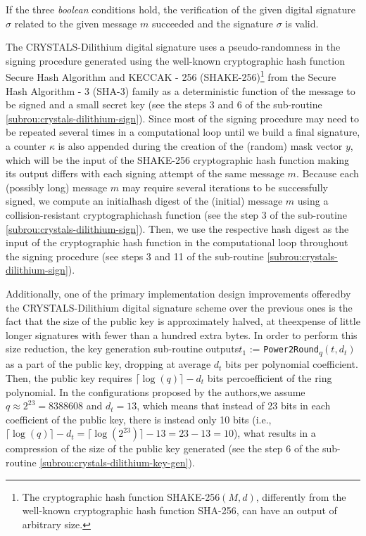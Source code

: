\documentclass[runningheads]{llncs}
\numberwithin{equation}{section}
\begin{document}
    \noindent If the three \textit{boolean} conditions hold, the verification of the given digital signature $\sigma$ related to the given message $m$ succeeded and the signature $\sigma$ is valid.

    The CRYSTALS-Dilithium digital signature uses a pseudo-randomness in the signing procedure generated using the well-known cryptographic hash function Secure Hash Algorithm and KECCAK - 256 (SHAKE-256)\footnote{The cryptographic hash function SHAKE-256$(M,d)$, differently from the well-known cryptographic hash function SHA-256, can have an output of arbitrary size.} from the Secure Hash Algorithm - 3 (SHA-3) family as a deterministic function of the message to be signed and a small secret key (see the steps 3 and 6 of the sub-routine \ref{subrou:crystals-dilithium-sign}). Since most of the signing procedure may need to be repeated several times in a computational loop until we build a final signature, a counter $\kappa$ is also appended during the creation of the (random) mask vector $y$, which will be the input of the SHAKE-256 cryptographic hash function making its output differs with each signing attempt of the same message $m$. Because each (possibly long) message $m$ may require several iterations to be successfully signed, we compute an initial\break hash digest of the (initial) message $m$ using a collision-resistant cryptographic\break hash function (see the step 3 of the sub-routine \ref{subrou:crystals-dilithium-sign}). Then, we use the respective hash digest as the input of the cryptographic hash function in the computational loop throughout the signing procedure (see steps 3 and 11 of the sub-routine \ref{subrou:crystals-dilithium-sign}).

    Additionally, one of the primary implementation design improvements offered\break by the CRYSTALS-Dilithium digital signature scheme over the previous ones is the fact that the size of the public key is approximately halved, at the\break expense of little longer signatures with fewer than a hundred extra bytes. In order to perform this size reduction, the key generation sub-routine outputs\break ${t}_{1}$ := \texttt{Power2Round}\textsubscript{$q$}$\left( t, {d}_{t} \right)$ as a part of the public key, dropping at average ${d}_{t}$ bits per polynomial coefficient. Then, the public key requires $\lceil \log{(q)} \rceil - {d}_{t}$ bits per\break coefficient of the ring polynomial. In the configurations proposed by the authors,\break we assume $q \approx {2}^{23} = 8388608$ and ${d}_{t} = 13$, which means that instead of 23 bits in each coefficient of the public key, there is instead only 10 bits (i.e., $\lceil \log{(q)} \rceil - {d}_{t} = \lceil \log{ ({2}^{23}) } \rceil - 13 = 23 - 13 = 10$), what results in a compression of the size of the public key generated (see the step 6 of the sub-routine \ref{subrou:crystals-dilithium-key-gen}).
\end{document}
